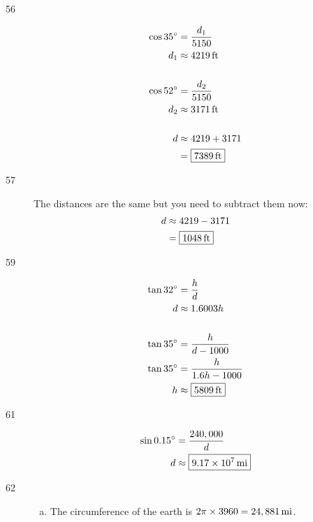 \documentclass{exam}
\newcommand{\dg}{\ensuremath{^\circ}}
\begin{document}
\begin{description}
      \item[56]
        \begin{align*}
          \cos 35 \dg & = \frac{d_1}{5150} \\
          d_1         & \approx \unit[4219]{ft} \\
          \\
          \cos 52 \dg & = \frac{d_2}{5150} \\
          d_2         & \approx \unit[3171]{ft} \\
          \\
          d & \approx 4219 + 3171 \\
            & = \boxed{ \unit[7389]{ft} } \\
        \end{align*}

      \item[57]
        The distances are the same but you need to subtract them now:
        \begin{align*}
          d & \approx 4219 - 3171 \\
            & = \boxed{ \unit[1048]{ft} } \\
        \end{align*}

      \item[59]
        \begin{align*}
            \tan 32 \dg & = \frac{h}{d} \\
            d           & \approx 1.6003 h \\
            \\
            \tan 35 \dg & = \frac{h}{d - 1000} \\
            \tan 35 \dg & = \frac{h}{1.6h - 1000} \\
            h           & \approx \boxed{ \unit[5809]{ft} } \\
        \end{align*}

      \item[61]
        \begin{align*}
            \sin 0.15 \dg & = \frac{240,000}{d} \\
            d           & \approx \boxed{ \unit[ 9.17 \times 10^7 ]{mi} }  \\
        \end{align*}

      \item[62]
        \begin{enumerate}[(a)]
          \item The circumference of the earth is $2 \pi \times 3960 = \unit[24,881]{mi}$.


\end{enumerate}
\end{description}
\end{document}
